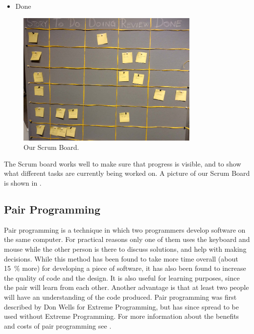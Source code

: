 \begin{description}
\begin{itemize}
		\item Done
	\end{itemize}
	\begin{figure}
	  \begin{center}
	    \includegraphics[width=0.80\textwidth]{figures/img/scrumboard_compressed.jpg}
	  \end{center}
	  \caption{Our Scrum Board.}
	  \label{fig:scrumboard}
	\end{figure}
	The Scrum board works well to make sure that progress is visible, and to show what different tasks are currently being worked on.
	A picture of our Scrum Board is shown in .
\end{description}

\subsection*{Pair Programming}\label{subsubsec:pairprogramming}
Pair programming is a technique in which two programmers develop software on the same computer. 
For practical reasons only one of them uses the keyboard and mouse while the other person is there to discuss solutions, and help with making decisions. 
While this method has been found to take more time overall (about 15~\% more) for developing a piece of software, it has also been found to increase the quality of code and the design.
It is also useful for learning purposes, since the pair will learn from each other. 
Another advantage is that at least two people will have an understanding of the code produced. 
Pair programming was first described by Don Wells for Extreme Programming, but has since spread to be used without Extreme Programming\citep{pairAgile}. 
For more information about the benefits and costs of pair programming see \cite{cockburn2000costs}.

